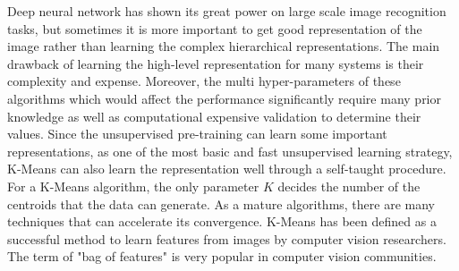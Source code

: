 ﻿Deep neural network has shown its great power on large scale image recognition tasks, but sometimes it is more important to get good representation of the image rather than learning the complex hierarchical representations\cite{CoatesNL11}. The main drawback of learning the high-level representation for many systems is their complexity and expense. Moreover, the multi hyper-parameters of these algorithms which would affect the performance significantly require many prior knowledge as well as computational expensive validation to determine their values. Since the unsupervised pre-training can learn some important representations,  as one of the most basic and fast unsupervised learning strategy, K-Means can also learn the representation well through a self-taught procedure. For a K-Means algorithm, the only parameter $K$ decides the number of the centroids that the data can generate. As a mature algorithms, there are many techniques that can accelerate its convergence\cite{pelleg1999accelerating}\cite{pelleg2000x}\cite{gibou2002fast}. K-Means has been defined as a successful method to learn features
from images by computer vision researchers. The term of "bag of features" is very popular in computer vision communities\cite{csurka2004visual}\cite{lazebnik2006beyond}.


